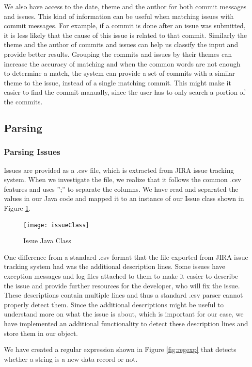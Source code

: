 We also have access to the date, theme and the author for both commit messages and issues.
This kind of information can be useful when matching issues with commit messages.
For example, if a commit is done after an issue was submitted, it is less likely that the cause of this issue is related to that commit.
Similarly the theme and the author of commits and issues can help us classify the input and provide better results.
Grouping the commits and issues by their themes can increase the accuracy of matching and when the common words are not enough to determine a match, the system can provide a set of commits with a similar theme to the issue, instead of a single matching commit.
This might make it easier to find the commit manually, since the user has to only search a portion of the commits.

\subsection{Parsing}

\subsubsection{Parsing Issues}
Issues are provided as a .csv file, which is extracted from JIRA issue tracking system.
When we investigate the file, we realize that it follows the common .csv features and uses '';'' to separate the columns.
We have read and separated the values in our Java code and mapped it to an instance of our Issue class shown in Figure \ref{fig:issue}. 

\begin{figure}
\centering
\texttt{[image: issueClass]}
\caption{Issue Java Class}
\label{fig:issue}
\end{figure}

One difference from a standard .csv format that the file exported from JIRA issue tracking system had was the additional description lines. Some issues have exception messages and log files attached to them to make it easier to describe the issue and provide further resources for the developer, who will fix the issue.
These descriptions contain multiple lines and thus a standard .csv parser cannot properly detect them.
Since the additional descriptions might be useful to understand more on what the issue is about, which is important for our case, we have implemented an additional functionality to detect these description lines and store them in our object.

We have created a regular expression shown in Figure \ref{fig:regexp} that detects whether a string is a new data record or not.

